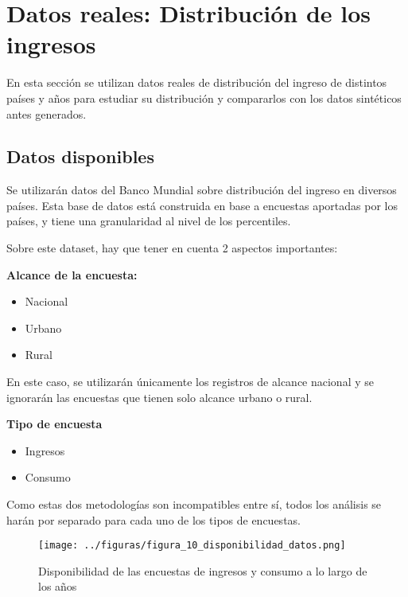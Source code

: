 \chapter{Datos reales: Distribución de los ingresos} \label{chapter:datos_reales_distribucion}

En esta sección se utilizan datos reales de distribución del ingreso de distintos países y años para estudiar su distribución y compararlos con los datos sintéticos antes generados.

\section{Datos disponibles}

Se utilizarán datos del Banco Mundial \cite{income_distribution_dataset} sobre distribución del ingreso en diversos países. Esta base de datos está construida en base a encuestas aportadas por los países, y tiene una granularidad al nivel de los percentiles.
    
Sobre este dataset, hay que tener en cuenta 2 aspectos importantes:

\textbf{Alcance de la encuesta:}

\begin{itemize}
    \item Nacional
    \item Urbano
    \item Rural
\end{itemize}

En este caso, se utilizarán únicamente los registros de alcance nacional y se ignorarán las encuestas que tienen solo alcance urbano o rural.

\textbf{Tipo de encuesta}

\begin{itemize}
    \item Ingresos
    \item Consumo
\end{itemize}

Como estas dos metodologías son incompatibles entre sí, todos los análisis se harán por separado para cada uno de los tipos de encuestas.

\begin{figure}[H] %
    \centering %
    \texttt{[image: ../figuras/figura\_10\_disponibilidad\_datos.png]} %
    \caption{Disponibilidad de las encuestas de ingresos y consumo a lo largo de los años}
    \label{fig:10} %
\end{figure}

